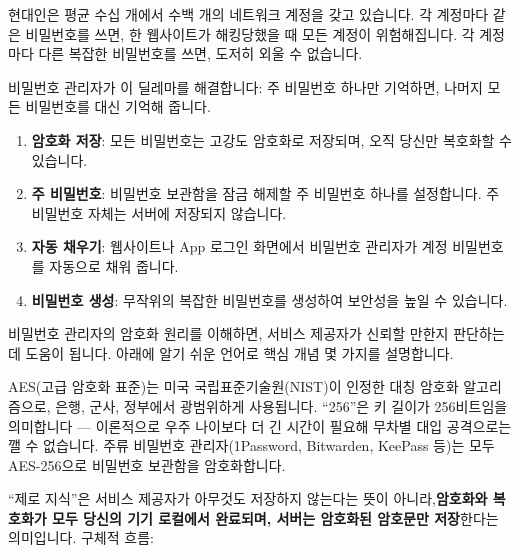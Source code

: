 


현대인은 평균 수십 개에서 수백 개의 네트워크 계정을 갖고 있습니다. 각 계정마다 같은 비밀번호를 쓰면, 한 웹사이트가 해킹당했을 때 모든 계정이 위험해집니다. 각 계정마다 다른 복잡한 비밀번호를 쓰면, 도저히 외울 수 없습니다.

비밀번호 관리자가 이 딜레마를 해결합니다: 주 비밀번호 하나만 기억하면, 나머지 모든 비밀번호를 대신 기억해 줍니다.


\begin{enumerate}
  \item \textbf{암호화 저장}: 모든 비밀번호는 고강도 암호화로 저장되며, 오직 당신만 복호화할 수 있습니다.
  \item \textbf{주 비밀번호}: 비밀번호 보관함을 잠금 해제할 주 비밀번호 하나를 설정합니다. 주 비밀번호 자체는 서버에 저장되지 않습니다.
  \item \textbf{자동 채우기}: 웹사이트나 App 로그인 화면에서 비밀번호 관리자가 계정 비밀번호를 자동으로 채워 줍니다.
  \item \textbf{비밀번호 생성}: 무작위의 복잡한 비밀번호를 생성하여 보안성을 높일 수 있습니다.
\end{enumerate}


비밀번호 관리자의 암호화 원리를 이해하면, 서비스 제공자가 신뢰할 만한지 판단하는 데 도움이 됩니다. 아래에 알기 쉬운 언어로 핵심 개념 몇 가지를 설명합니다.


AES(고급 암호화 표준)는 미국 국립표준기술원(NIST)이 인정한 대칭 암호화 알고리즘으로, 은행, 군사, 정부에서 광범위하게 사용됩니다. “256”은 키 길이가 256비트임을 의미합니다 — 이론적으로 우주 나이보다 더 긴 시간이 필요해 무차별 대입 공격으로는 깰 수 없습니다. 주류 비밀번호 관리자(1Password, Bitwarden, KeePass 등)는 모두 AES-256으로 비밀번호 보관함을 암호화합니다.


“제로 지식”은 서비스 제공자가 아무것도 저장하지 않는다는 뜻이 아니라,\textbf{암호화와 복호화가 모두 당신의 기기 로컬에서 완료되며, 서버는 암호화된 암호문만 저장}한다는 의미입니다. 구체적 흐름:

